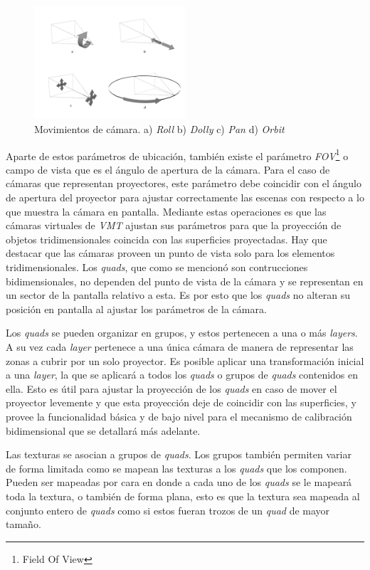 \begin{figure}[H]
  \centering
    \includegraphics[width=0.5\textwidth]{./Cap5_vmt/vmtengine-cameramove.png}
  \caption{Movimientos de cámara. a) \emph{Roll} b) \emph{Dolly} c) \emph{Pan} d) \emph{Orbit}}
  \label{fig:VMT-CameraMove}
\end{figure}

Aparte de estos parámetros de ubicación, también existe el parámetro \emph{FOV}\footnote{Field Of View} o campo de vista que es el ángulo de apertura de la cámara. Para el caso de cámaras que representan proyectores, este parámetro debe coincidir con el ángulo de apertura del proyector para ajustar correctamente las escenas con respecto a lo que muestra la cámara en pantalla.
Mediante estas operaciones es que las cámaras virtuales de \emph{VMT} ajustan sus parámetros para que la proyección de objetos tridimensionales coincida con las superficies proyectadas.
Hay que destacar que las cámaras proveen un punto de vista solo para los elementos tridimensionales. Los \emph{quads}, que como se mencionó son contrucciones bidimensionales, no dependen del punto de vista de la cámara y se representan en un sector de la pantalla relativo a esta. Es por esto que los \emph{quads} no alteran su posición en pantalla al ajustar los parámetros de la cámara.

Los \emph{quads} se pueden organizar en grupos, y estos pertenecen a una o más \emph{layers}. A su vez cada \emph{layer} pertenece a una única cámara de manera de representar las zonas a cubrir por un solo proyector. Es posible aplicar una transformación inicial a una \emph{layer}, la que se aplicará a todos los \emph{quads} o grupos de \emph{quads} contenidos en ella. Esto es útil para ajustar la proyección de los \emph{quads} en caso de mover el proyector levemente y que esta proyección deje de coincidir con las superficies, y provee la funcionalidad básica y de bajo nivel para el mecanismo de calibración bidimensional que se detallará más adelante.

Las texturas se asocian a grupos de \emph{quads}. Los grupos también permiten variar de forma limitada como se mapean las texturas a los \emph{quads} que los componen. Pueden ser mapeadas por cara en donde a cada uno de los \emph{quads} se le mapeará toda la textura, o también de forma plana, esto es que la textura sea mapeada al conjunto entero de \emph{quads} como si estos fueran trozos de un \emph{quad} de mayor tamaño.

